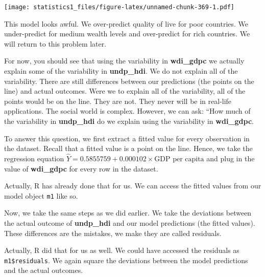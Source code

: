 \documentclass[]{article}
\newenvironment{Shaded}{\begin{snugshade}}{\end{snugshade}}
\newcommand{\StringTok}[1]{\textcolor[rgb]{0.31,0.60,0.02}{#1}}
\newcommand{\CommentTok}[1]{\textcolor[rgb]{0.56,0.35,0.01}{\textit{#1}}}
\newcommand{\OperatorTok}[1]{\textcolor[rgb]{0.81,0.36,0.00}{\textbf{#1}}}
\newcommand{\NormalTok}[1]{#1}
\theoremstyle{definition}
\theoremstyle{definition}
\theoremstyle{definition}
\theoremstyle{remark}
\begin{document}
\texttt{[image: statistics1\_files/figure-latex/unnamed-chunk-369-1.pdf]}

This model looks awful. We over-predict quality of live for poor
countries. We under-predict for medium wealth levels and over-predict
for rich countries. We will return to this problem later.

For now, you should see that using the variability in \textbf{wdi\_gdpc}
we actually explain some of the variability in \textbf{undp\_hdi}. We do
not explain all of the variability. There are still differences between
our predictions (the points on the line) and actual outcomes. Were we to
explain all of the variability, all of the points would be on the line.
They are not. They never will be in real-life applications. The social
world is complex. However, we can ask: ``How much of the variability in
\textbf{undp\_hdi} do we explain using the variability in
\textbf{wdi\_gdpc}.

To answer this question, we first extract a fitted value for every
observation in the dataset. Recall that a fitted value is a point on the
line. Hence, we take the regression equation
\(\hat{Y} = 0.5855759 + 0.000102 \times \textrm{GDP per capita}\) and
plug in the value of \textbf{wdi\_gdpc} for every row in the dataset.

Actually, R has already done that for us. We can access the fitted
values from our model object \texttt{m1} like so.

\begin{Shaded}
\end{Shaded}

Now, we take the same steps as we did earlier. We take the deviations
between the actual outcome of \textbf{undp\_hdi} and our model
predictions (the fitted values). These differences are the mistakes, we
make they are called residuals.

\begin{Shaded}
\end{Shaded}

Actually, R did that for us as well. We could have accessed the
residuals as \texttt{m1\$residuals}. We again square the deviations
between the model predictions and the actual outcomes.
\end{document}
